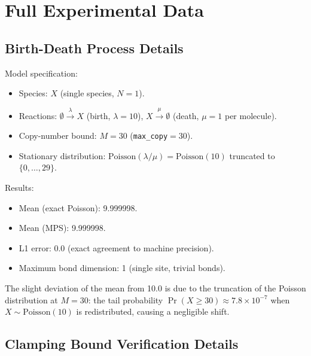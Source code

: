 \documentclass[11pt]{article}
\begin{document}
\section{Full Experimental Data}\label{app:experiments}

\subsection{Birth-Death Process Details}

Model specification:
\begin{itemize}[itemsep=1pt]
\item Species: $X$ (single species, $N=1$).
\item Reactions: $\emptyset \xrightarrow{\lambda} X$ (birth, $\lambda = 10$),
  $X \xrightarrow{\mu} \emptyset$ (death, $\mu = 1$ per molecule).
\item Copy-number bound: $M = 30$ (\texttt{max\_copy}${}=30$).
\item Stationary distribution: $\mathrm{Poisson}(\lambda/\mu) = \mathrm{Poisson}(10)$
  truncated to $\{0,\ldots,29\}$.
\end{itemize}

Results:
\begin{itemize}[itemsep=1pt]
\item Mean (exact Poisson): 9.999998.
\item Mean (MPS): 9.999998.
\item L1 error: 0.0 (exact agreement to machine precision).
\item Maximum bond dimension: 1 (single site, trivial bonds).
\end{itemize}

The slight deviation of the mean from 10.0 is due to the truncation
of the Poisson distribution at $M=30$: the tail probability
$\Pr(X \geq 30) \approx 7.8 \times 10^{-7}$ when $X \sim \text{Poisson}(10)$
is redistributed, causing a negligible shift.

\subsection{Clamping Bound Verification Details}
\end{document}
